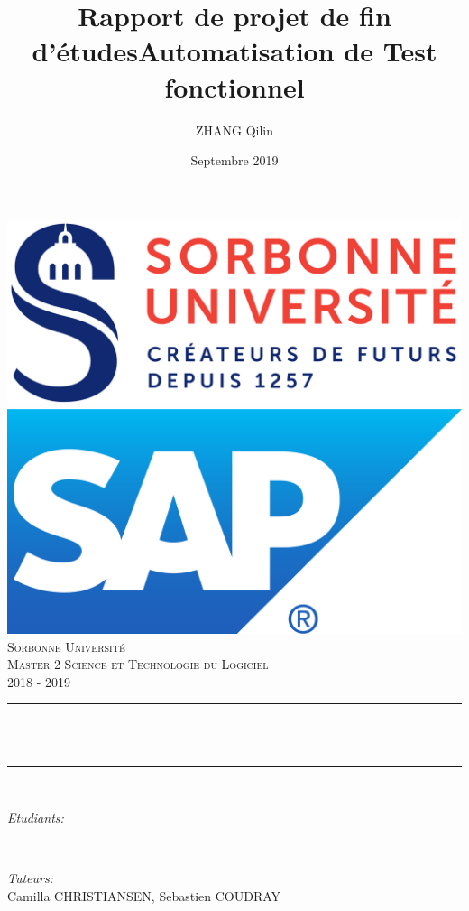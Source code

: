 \documentclass[12pt]{article}
\title{\textbf{Rapport de projet de fin d'études\newline Automatisation de Test fonctionnel}}    %
\author{ZHANG Qilin}		%
\date{Septembre 2019}											%
\makeatletter
\let\thetitle\@title
\let\theauthor\@author
\let\thedate\@date
\makeatother
\begin{document}

\begin{titlepage}
	\centering
    \vspace*{0.5 cm}
    \includegraphics[scale = 0.15]{Logo_officiel_Sorbonne_University}\\[0.8 cm]	%
    \includegraphics[scale = 0.15]{SAP_R_grad.jpg}
    \textsc{\LARGE Sorbonne Université}\\[2.0 cm]	%
	\textsc{\Large Master 2 Science et Technologie du Logiciel\\2018 - 2019}\\[0.5 cm]		%
	\rule{\linewidth}{0.8 mm} \\[0.6 cm]
	{ \huge \bfseries \thetitle}\\
	\rule{\linewidth}{0.8 mm} \\[2.6 cm]

	\begin{minipage}{0.4\textwidth}
		\begin{flushleft} \large
			\emph{Etudiants:}\\
			\theauthor
			\end{flushleft}
			\end{minipage}~
			\begin{minipage}{0.4\textwidth}
			\begin{flushright} \large
			\emph{Tuteurs:} \\
			Camilla CHRISTIANSEN, Sebastien COUDRAY %
		\end{flushright}
	\end{minipage}\\[0.5 cm]
	
	{\large \thedate}\\[2 cm]
 
	\vfill
	
\end{titlepage}
\end{document}
